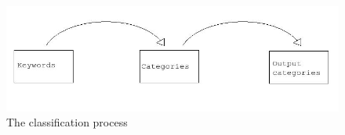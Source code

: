 \begin{figure}[H]
\centering
\includegraphics[width=1\textwidth]{classification_process.jpeg}
\caption{The classification process}
\label{fig:classification_process}
\end{figure}

